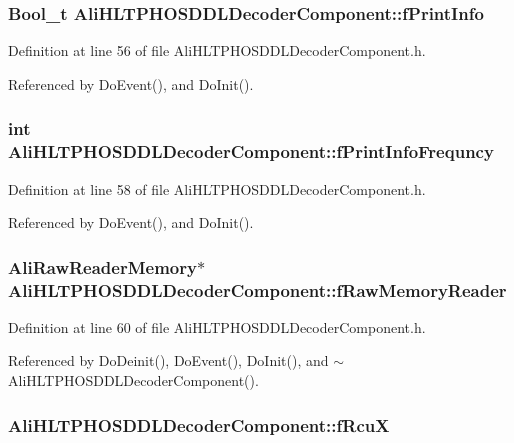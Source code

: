 \subsubsection{\setlength{\rightskip}{0pt plus 5cm}Bool\_\-t {\bf Ali\-HLTPHOSDDLDecoder\-Component::f\-Print\-Info}\hspace{0.3cm}{\tt  [private]}}\label{classAliHLTPHOSDDLDecoderComponent_r7}




Definition at line 56 of file Ali\-HLTPHOSDDLDecoder\-Component.h.

Referenced by Do\-Event(), and Do\-Init().
\subsubsection{\setlength{\rightskip}{0pt plus 5cm}int {\bf Ali\-HLTPHOSDDLDecoder\-Component::f\-Print\-Info\-Frequncy}\hspace{0.3cm}{\tt  [private]}}\label{classAliHLTPHOSDDLDecoderComponent_r9}




Definition at line 58 of file Ali\-HLTPHOSDDLDecoder\-Component.h.

Referenced by Do\-Event(), and Do\-Init().
\subsubsection{\setlength{\rightskip}{0pt plus 5cm}Ali\-Raw\-Reader\-Memory$\ast$ {\bf Ali\-HLTPHOSDDLDecoder\-Component::f\-Raw\-Memory\-Reader}\hspace{0.3cm}{\tt  [private]}}\label{classAliHLTPHOSDDLDecoderComponent_r11}




Definition at line 60 of file Ali\-HLTPHOSDDLDecoder\-Component.h.

Referenced by Do\-Deinit(), Do\-Event(), Do\-Init(), and $\sim$Ali\-HLTPHOSDDLDecoder\-Component().
\subsubsection{ {\bf Ali\-HLTPHOSDDLDecoder\-Component::f\-Rcu\-X}\hspace{0.3cm}{\tt  [private]}}\label{classAliHLTPHOSDDLDecoderComponent_r1}




